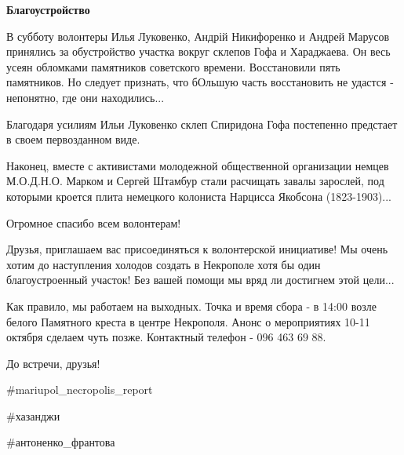 \textbf{Благоустройство}

В субботу волонтеры Илья Луковенко, Андрій Никифоренко и Андрей Марусов
принялись за обустройство участка вокруг склепов Гофа и Хараджаева. Он весь
усеян обломками памятников советского времени. Восстановили пять памятников. Но
следует признать, что бОльшую часть восстановить не удастся - непонятно, где
они находились...

Благодаря усилиям Ильи Луковенко склеп Спиридона Гофа постепенно предстает в
своем первозданном виде.

Наконец, вместе с активистами молодежной общественной организации немцев
М.О.Д.Н.О. Марком и Сергей Штамбур стали расчищать завалы зарослей, под
которыми кроется плита немецкого колониста Нарцисса Якобсона (1823-1903)...

Огромное спасибо всем волонтерам!

Друзья, приглашаем вас присоединяться к волонтерской инициативе! Мы очень хотим
до наступления холодов создать в Некрополе хотя бы один благоустроенный
участок! Без вашей помощи мы вряд ли достигнем этой цели...

Как правило, мы работаем на выходных. Точка и время сбора - в 14:00 возле
белого Памятного креста в центре Некрополя. Анонс о мероприятиях 10-11 октября
сделаем чуть позже. Контактный телефон - 096 463 69 88.

До встречи, друзья!

\#mariupol\_necropolis\_report

\#хазанджи

\#антоненко\_франтова

